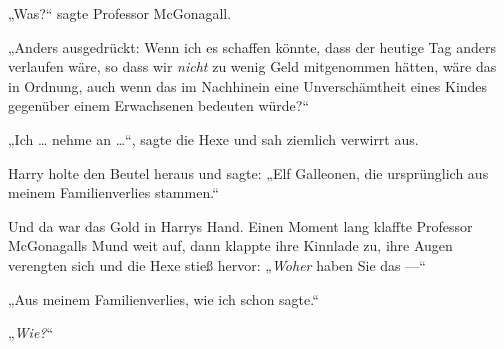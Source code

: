 „Was?“ sagte Professor McGonagall.

„Anders ausgedrückt: Wenn ich es schaffen könnte, dass der heutige Tag anders verlaufen wäre, so dass wir \emph{nicht} zu wenig Geld mitgenommen hätten, wäre das in Ordnung, auch wenn das im Nachhinein eine Unverschämtheit eines Kindes gegenüber einem Erwachsenen bedeuten würde?“

„Ich … nehme an …“, sagte die Hexe und sah ziemlich verwirrt aus.

Harry holte den Beutel heraus und sagte:
„Elf Galleonen, die ursprünglich aus meinem Familienverlies stammen.“

Und da war das Gold in Harrys Hand. Einen Moment lang klaffte Professor McGonagalls Mund weit auf, dann klappte ihre Kinnlade zu, ihre Augen verengten sich und die Hexe stieß hervor:
„\emph{Woher} haben Sie das —“




„Aus meinem Familienverlies, wie ich schon sagte.“

„\emph{Wie?}“

